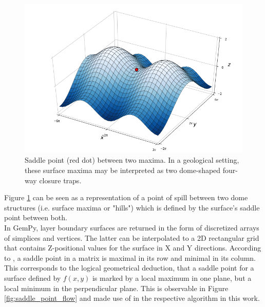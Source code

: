 			\begin{figure}[h]
				\centering
				\includegraphics[width=1\textwidth]{Figures/Saddle_Point_between_maxima.png}
				\caption{Saddle point (red dot) between two maxima. In a geological setting, these surface maxima may be interpreted as two dome-shaped four-way closure traps.}\label{fig:saddle_point_maxima}
			\end{figure}
			Figure \ref{fig:saddle_point_maxima} can be seen as a representation of a point of spill between two dome structures (i.e. surface maxima or "hills") which is defined by the surface's saddle point between both.\\			
			In GemPy, layer boundary surfaces are returned in the form of discretized arrays of simplices and vertices. The latter can be interpolated to a 2D rectangular grid that contains Z-positional values for the surface in X and Y directions. According to \citet{verschelde2017programmingtools}, a saddle point in a matrix is maximal in its row and minimal in its column. This corresponds to the logical geometrical deduction, that a saddle point for a surface defined by $f(x,y)$ is marked by a local maximum in one plane, but a local minimum in the perpendicular plane. This is observable in Figure \ref{fig:saddle_point_flow} and made use of in the respective algorithm in this work.

